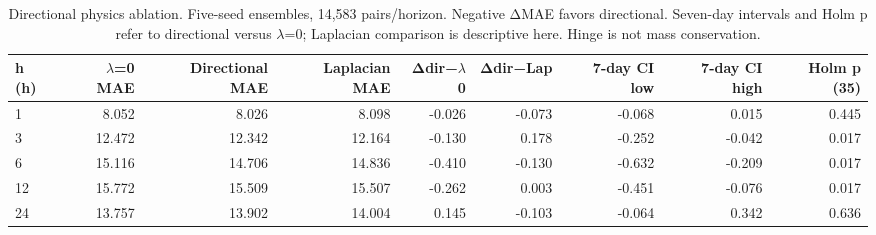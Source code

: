 \begin{table}[t]
\centering
\footnotesize
\caption{Directional physics ablation. Five-seed ensembles, 14,583 pairs/horizon. Negative ΔMAE favors directional. Seven-day intervals and Holm p refer to directional versus $\lambda$=0; Laplacian comparison is descriptive here. Hinge is not mass conservation.}
\label{tab:t03}
\begin{tabular}{lrrrrrrrr}
\hline
h (h) & $\lambda$=0 MAE & Directional MAE & Laplacian MAE & Δdir−$\lambda$0 & Δdir−Lap & 7-day CI low & 7-day CI high & Holm p (35) \\
\hline
1 & 8.052 & 8.026 & 8.098 & -0.026 & -0.073 & -0.068 & 0.015 & 0.445 \\
3 & 12.472 & 12.342 & 12.164 & -0.130 & 0.178 & -0.252 & -0.042 & 0.017 \\
6 & 15.116 & 14.706 & 14.836 & -0.410 & -0.130 & -0.632 & -0.209 & 0.017 \\
12 & 15.772 & 15.509 & 15.507 & -0.262 & 0.003 & -0.451 & -0.076 & 0.017 \\
24 & 13.757 & 13.902 & 14.004 & 0.145 & -0.103 & -0.064 & 0.342 & 0.636 \\
\hline
\end{tabular}
\end{table}
